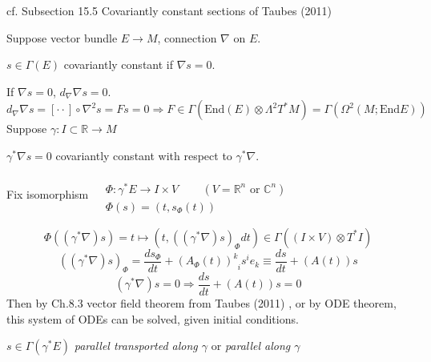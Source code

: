 \documentclass[10pt, twoside]{amsart}
\begin{document}
\begin{multicols*}{2}
cf. Subsection 15.5 Covariantly constant sections of  Taubes (2011) \cite{CTaubes2011}

Suppose vector bundle $E\to M$, connection $\nabla $ on $E$.  



$s\in \Gamma(E)$ covariantly constant if $\nabla s=0$.  

If $\nabla s = 0$, $d_{\nabla} \nabla s=0$.  
\[
d_{\nabla} \nabla s = [ \cdot \cdot ] \circ \nabla^2 s = Fs = 0 \Longrightarrow F  \in \Gamma(\text{End}(E)\otimes \Lambda^2 T^*M) = \Gamma(\Omega^2(M; \text{End}E))
\]
Suppose $\gamma : I \subset \mathbb{R} \to M$

$\gamma^* \nabla s =0$ covariantly constant with respect to $\gamma^* \nabla$.  

Fix isomorphism $\begin{aligned} & \quad \\
  & \Phi : \gamma^* E \to I \times V \qquad \, (V= \mathbb{R}^n \text{ or } \mathbb{C}^n) \\ 
  & \Phi(s) = (t,s_{\Phi}(t)) \end{aligned}$

\[
\Phi((\gamma^*\nabla)s) = t\mapsto (t,((\gamma^*\nabla )s)_{\Phi} dt) \in \Gamma((I\times V)\otimes T^*I ) 
\]
\[
((\gamma^* \nabla)s)_{\Phi} = \frac{ds_{\Phi}}{dt} + (A_{\Phi}(t))^k_{ \; \; i } s^i e_k \equiv \frac{ds}{dt} + (A(t))s
\]
\[
(\gamma^* \nabla)s = 0 \Longrightarrow \frac{ds}{dt} + (A(t))s = 0 
\]
Then by Ch.8.3 vector field theorem from Taubes (2011) \cite{CTaubes2011}, or by ODE theorem, this system of ODEs can be solved, given initial conditions.  




$s\in \Gamma(\gamma^* E)$ \emph{ parallel transported along $\gamma$} or \emph{ parallel along $\gamma$}


\end{multicols*}
\end{document}
